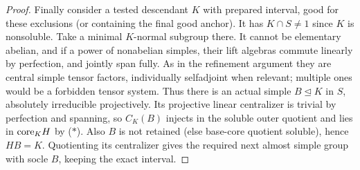 \begin{proof}
Finally consider a tested descendant \(K\) with prepared interval, good for these exclusions (or containing the final good anchor). It has \(K\cap S\ne1\) since \(K\) is nonsoluble. Take a minimal \(K\)-normal subgroup there. It cannot be elementary abelian, and if a power of nonabelian simples, their lift algebras commute linearly by perfection, and jointly span fully. As in the refinement argument they are central simple tensor factors, individually selfadjoint when relevant; multiple ones would be a forbidden tensor system. Thus there is an actual simple \(B\trianglelefteq K\) in \(S\), absolutely irreducible projectively. Its projective linear centralizer is trivial by perfection and spanning, so \(C_K(B)\) injects in the soluble outer quotient and lies in \({\rm core}_K H\) by (\(*\)). Also \(B\) is not retained (else base-core quotient soluble), hence \(HB=K\). Quotienting its centralizer gives the required next almost simple group with socle \(B\), keeping the exact interval.
\end{proof}

